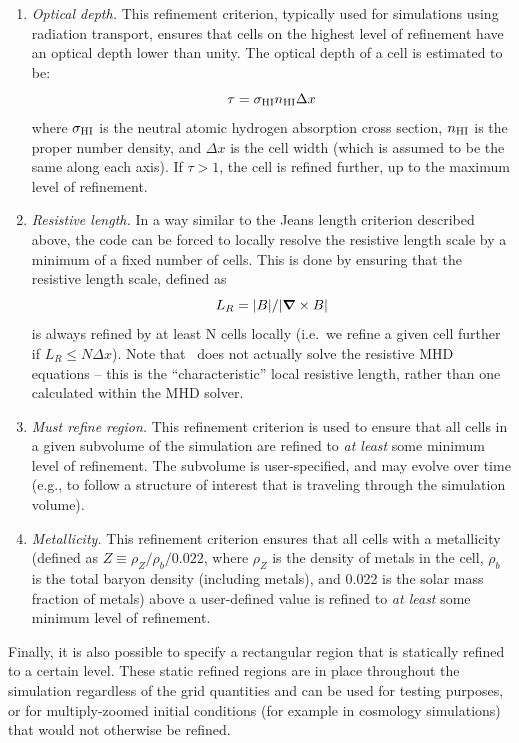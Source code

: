 \begin{enumerate}
\item{\em Optical depth.} This refinement criterion, typically used for simulations using radiation transport, ensures that cells on the highest level of refinement have an  optical depth lower than unity.  The optical depth of a cell is estimated to be:
\begin{equation}
\tau = \sigma_{\rm HI} n_{\rm HI} \Delta x 
\end{equation}
where $\sigma_{\rm HI}$ is the neutral atomic hydrogen absorption
cross section, $n_{\rm HI}$ is the proper  number density,
and $\Delta x$ is the cell width (which is assumed to be the same along each axis).  If $\tau > 1$, the cell is refined
further, up to the maximum level of refinement.

\item{\em Resistive length.}  In a way similar to the Jeans length criterion described above, the code can be forced to locally resolve the resistive length scale by a minimum of a fixed number of cells.  This is done by ensuring that the resistive length scale, defined as
\begin{equation}
L_R = |B| / |\curl B|
\end{equation}
is always refined by at least N cells locally (i.e.~we refine a given cell further if $L_R \leq N \Delta x$).  Note that \enzo\ does not actually solve the resistive MHD equations -- this is the ``characteristic'' local resistive length, rather than one calculated within the MHD solver.

\item{\em Must refine region.}  This refinement criterion is used to ensure that all cells in a given subvolume of the simulation are refined to {\it at least} some minimum level of refinement.  The subvolume is user-specified, and may evolve over time (e.g., to follow a structure of interest that is traveling through the simulation volume).

\item{\em Metallicity.}  This refinement criterion ensures that all cells with a metallicity (defined as $Z \equiv \rho_{Z} / \rho_{b} / 0.022$, where $\rho_{Z}$ is the density of metals in the cell, $\rho_{b}$ is the total baryon density (including metals), and 0.022 is the solar mass fraction of metals) above a user-defined value is refined to {\it at least} some minimum level of refinement. 

\end{enumerate}

Finally, it is also possible to specify a rectangular region that is statically refined to a certain level.  These static refined regions are in place throughout the simulation regardless of the grid quantities and can be used for testing purposes, or for multiply-zoomed initial conditions (for example in cosmology simulations) that would not otherwise be refined.

